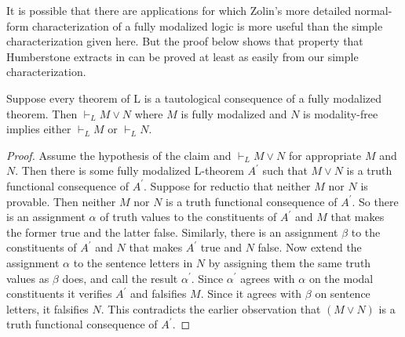 \documentclass[11pt]{article}
\begin{document}
It is possible that there are applications for which Zolin's more detailed normal-form characterization of a fully modalized logic is more useful than the simple characterization given here. But the proof below shows that property that Humberstone extracts in \citet{Humberstone2016} can be proved at least as easily from our simple characterization.


\begin{theorem}
Suppose every theorem of L is a tautological consequence of a fully modalized theorem. Then $\vdash_LM\vee N$ where $M$ is fully modalized and $N$ is modality-free implies either $\vdash_LM$ or $\vdash_LN$. 
\end{theorem}
\begin{proof}
Assume the hypothesis of the claim and $\vdash_LM\vee N$ for appropriate $M$ and $N$. Then there is some fully modalized L-theorem $A^\prime$ such that $M\vee N$ is a truth functional consequence of $A^\prime$. Suppose for reductio that neither $M$ nor $N$ is provable. Then neither $M$ nor $N$ is a truth functional consequence of $A^\prime$. So there is an assignment $\alpha$ of truth values to the constituents of $A^\prime$ and $M$ that makes the former true and the latter false. Similarly, there is an assignment $\beta$ to the constituents of $A^\prime$ and $N$ that makes $A^\prime$ true and $N$ false. Now extend the assignment $\alpha$ to the sentence letters in $N$ by assigning them the same truth values as $\beta$ does, and call the result $\alpha^\prime$. Since $\alpha^\prime$ agrees with $\alpha$ on the modal constituents it verifies $A^\prime$ and falsifies $M$. Since it agrees with $\beta$ on sentence letters, it falsifies $N$. This contradicts the earlier observation that $(M\vee N)$ is a truth functional consequence of $A^\prime$.
\end{proof}
\end{document}
